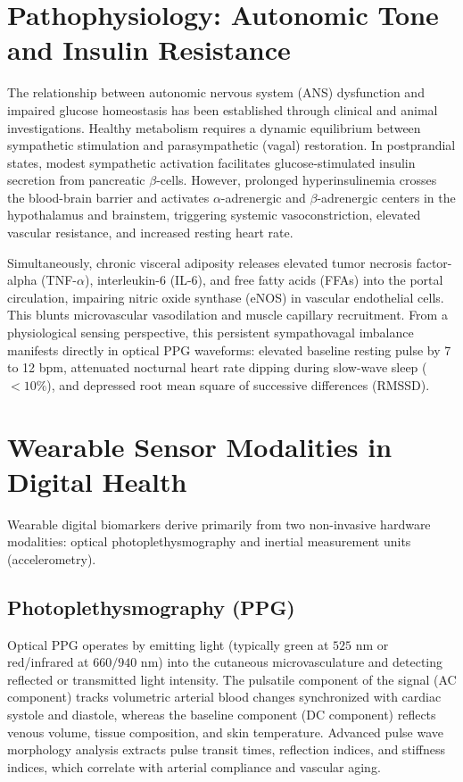 \documentclass[12pt,a4paper,oneside]{report}
\begin{document}
\section{Pathophysiology: Autonomic Tone and Insulin Resistance}
The relationship between autonomic nervous system (ANS) dysfunction and impaired glucose homeostasis has been established through clinical and animal investigations. Healthy metabolism requires a dynamic equilibrium between sympathetic stimulation and parasympathetic (vagal) restoration. In postprandial states, modest sympathetic activation facilitates glucose-stimulated insulin secretion from pancreatic $\beta$-cells. However, prolonged hyperinsulinemia crosses the blood-brain barrier and activates $\alpha$-adrenergic and $\beta$-adrenergic centers in the hypothalamus and brainstem, triggering systemic vasoconstriction, elevated vascular resistance, and increased resting heart rate.

Simultaneously, chronic visceral adiposity releases elevated tumor necrosis factor-alpha (TNF-$\alpha$), interleukin-6 (IL-6), and free fatty acids (FFAs) into the portal circulation, impairing nitric oxide synthase (eNOS) in vascular endothelial cells. This blunts microvascular vasodilation and muscle capillary recruitment. From a physiological sensing perspective, this persistent sympathovagal imbalance manifests directly in optical PPG waveforms: elevated baseline resting pulse by 7 to 12 bpm, attenuated nocturnal heart rate dipping during slow-wave sleep ($< 10\%$), and depressed root mean square of successive differences (RMSSD).

\section{Wearable Sensor Modalities in Digital Health}
Wearable digital biomarkers derive primarily from two non-invasive hardware modalities: optical photoplethysmography and inertial measurement units (accelerometry).

\subsection{Photoplethysmography (PPG)}
Optical PPG operates by emitting light (typically green at $525\text{ nm}$ or red/infrared at $660/940\text{ nm}$) into the cutaneous microvasculature and detecting reflected or transmitted light intensity. The pulsatile component of the signal (AC component) tracks volumetric arterial blood changes synchronized with cardiac systole and diastole, whereas the baseline component (DC component) reflects venous volume, tissue composition, and skin temperature. Advanced pulse wave morphology analysis extracts pulse transit times, reflection indices, and stiffness indices, which correlate with arterial compliance and vascular aging.
\end{document}
